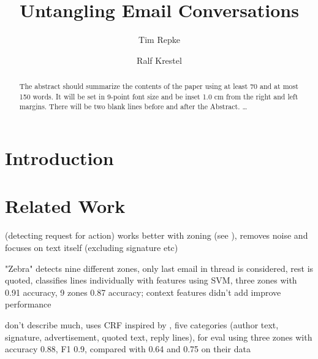 \documentclass{llncs}
\begin{document}
%
\frontmatter          %
%
\pagestyle{headings}  %

\mainmatter              %
%
\title{Untangling Email Conversations}
%
%
\author{Tim Repke \and Ralf Krestel}
%
%
%

\maketitle              %

\begin{abstract}
The abstract should summarize the contents of the paper
using at least 70 and at most 150 words. It will be set in 9-point
font size and be inset 1.0 cm from the right and left margins.
There will be two blank lines before and after the Abstract. \dots
\end{abstract}
%
\section{Introduction}


\section{Related Work}
\cite{rfa} (detecting request for action) works better with zoning (see \cite{zones}), removes noise and focuses on text itself (excluding signature etc)

\cite{zones} "Zebra" detects nine different zones, only last email in thread is considered, rest is quoted, classifies lines individually with features using SVM, three zones with 0.91 accuracy, 9 zones 0.87 accuracy; context features didn't add improve performance

\cite{profiling} don't describe much, uses CRF inspired by \cite{signature}, five categories (author text, signature, advertisement, quoted text, reply lines), for eval using three zones with accuracy 0.88, F1 0.9, compared with \cite{signature} 0.64 and 0.75 on their data
\end{document}
